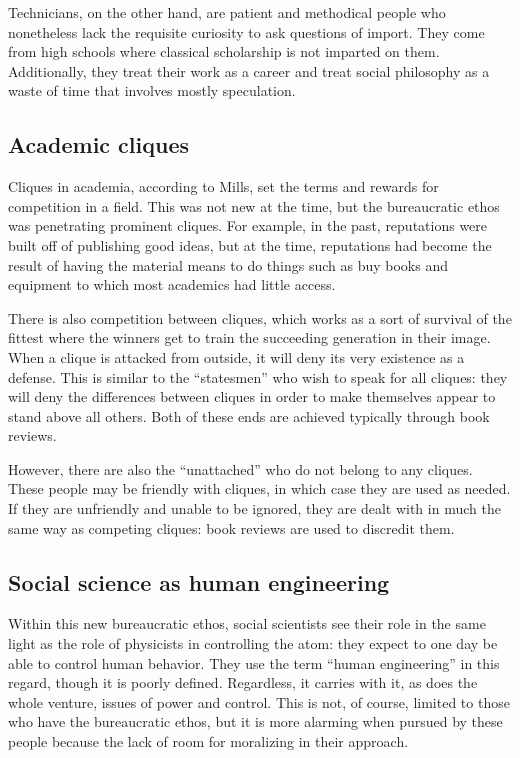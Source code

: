 \documentclass{article}
\begin{document}
      Technicians, on the other hand, are patient and methodical people who nonetheless lack the requisite curiosity to ask questions of import.
      They come from high schools where classical scholarship is not imparted on them.
      Additionally, they treat their work as a career and treat social philosophy as a waste of time that involves mostly speculation.

    \subsection{Academic cliques}
      Cliques in academia, according to Mills, set the terms and rewards for competition in a field.
      This was not new at the time, but the bureaucratic ethos was penetrating prominent cliques.
      For example, in the past, reputations were built off of publishing good ideas, but at the time, reputations had become the result of having the material means to do things such as buy books and equipment to which most academics had little access.

      There is also competition between cliques, which works as a sort of survival of the fittest where the winners get to train the succeeding generation in their image.
      When a clique is attacked from outside, it will deny its very existence as a defense.
      This is similar to the ``statesmen'' who wish to speak for all cliques: they will deny the differences between cliques in order to make themselves appear to stand above all others.
      Both of these ends are achieved typically through book reviews.

      However, there are also the ``unattached'' who do not belong to any cliques.
      These people may be friendly with cliques, in which case they are used as needed.
      If they are unfriendly and unable to be ignored, they are dealt with in much the same way as competing cliques: book reviews are used to discredit them.

    \subsection{Social science as human engineering}
      Within this new bureaucratic ethos, social scientists see their role in the same light as the role of physicists in controlling the atom: they expect to one day be able to control human behavior.
      They use the term ``human engineering'' in this regard, though it is poorly defined.
      Regardless, it carries with it, as does the whole venture, issues of power and control.
      This is not, of course, limited to those who have the bureaucratic ethos, but it is more alarming when pursued by these people because the lack of room for moralizing in their approach.
\end{document}
